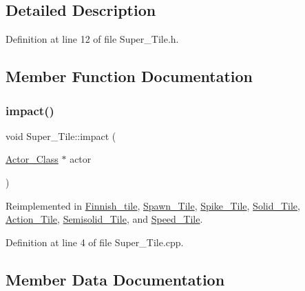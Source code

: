 \subsection{Detailed Description}


Definition at line 12 of file Super\+\_\+\+Tile.\+h.



\subsection{Member Function Documentation}
\hypertarget{class_super___tile_a7b509383d0d0ad2df0220f7dc4660823}{}\label{class_super___tile_a7b509383d0d0ad2df0220f7dc4660823} 
\subsubsection{\texorpdfstring{impact()}{impact()}}
{\footnotesize\ttfamily void Super\+\_\+\+Tile\+::impact (\begin{DoxyParamCaption}\item[{\hyperlink{class_actor___class}{Actor\+\_\+\+Class} $\ast$}]{actor }\end{DoxyParamCaption})\hspace{0.3cm}{\ttfamily [virtual]}}



Reimplemented in \hyperlink{class_finnish__tile_a04fae2c808c18027ec8b74915df33220}{Finnish\+\_\+tile}, \hyperlink{class_spawn___tile_a9b557377a8afd06512ac19368a4f14a4}{Spawn\+\_\+\+Tile}, \hyperlink{class_spike___tile_a8673c82f84733fe73c456eee725a6ab0}{Spike\+\_\+\+Tile}, \hyperlink{class_solid___tile_ada34ec00762b7df804292f40fbeecc95}{Solid\+\_\+\+Tile}, \hyperlink{class_action___tile_aa366fba2ea9d3947c28c45f939ee0217}{Action\+\_\+\+Tile}, \hyperlink{class_semisolid___tile_a65c8e43f414282be042b81c62fc63431}{Semisolid\+\_\+\+Tile}, and \hyperlink{class_speed___tile_aea424ba028f29398ace251a3a664b874}{Speed\+\_\+\+Tile}.



Definition at line 4 of file Super\+\_\+\+Tile.\+cpp.



\subsection{Member Data Documentation}
\hypertarget{class_super___tile_a11736ca52512c43b001d69a805c83de5}{}\label{class_super___tile_a11736ca52512c43b001d69a805c83de5} 
